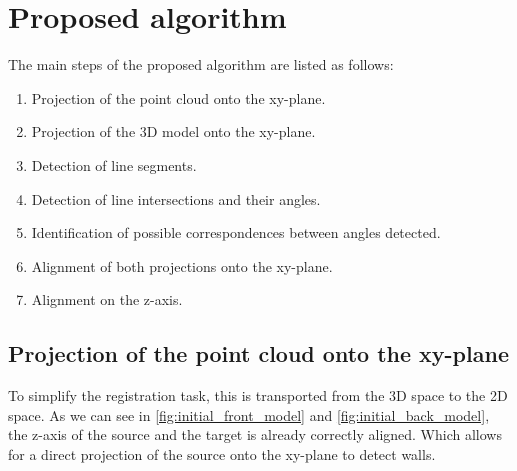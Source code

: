     \section{Proposed algorithm}
        The main steps of the proposed algorithm are listed as follows:
        \begin{enumerate}
            \itemsep 0em 
            \item Projection of the point cloud onto the xy-plane.
            \item Projection of the 3D model onto the xy-plane.
            \item Detection of line segments.
            \item Detection of line intersections and their angles.
            \item Identification of possible correspondences between angles detected.
            \item Alignment of both projections onto the xy-plane.
            \item Alignment on the z-axis.
        \end{enumerate}

        \subsection{Projection of the point cloud onto the xy-plane}
        \label{sub:Projection of the point cloud onto the xy-plane}
            To simplify the registration task, this is transported from the 3D space to the 2D space.
            As we can see in \autoref{fig:initial_front_model} and \autoref{fig:initial_back_model}, 
            the z-axis of the source and the target is already correctly aligned.
            Which allows for a direct projection of the source onto the xy-plane to detect walls.

